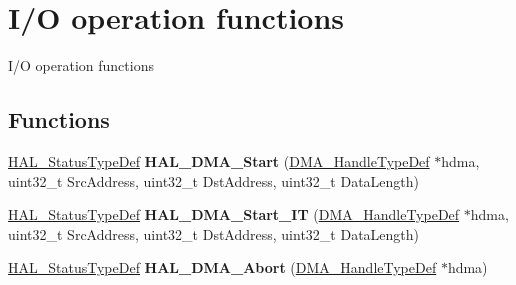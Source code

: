 \hypertarget{group___d_m_a___exported___functions___group2}{}\section{I/O operation functions}
\label{group___d_m_a___exported___functions___group2}


I/O operation functions ~\newline
  


\subsection*{Functions}
\begin{DoxyCompactItemize}
\item 
\mbox{\label{group___d_m_a___exported___functions___group2_ga96fbd9c285135f558fd9283a57406330}} 
\mbox{\hyperlink{stm32f4xx__hal__def_8h_a63c0679d1cb8b8c684fbb0632743478f}{H\+A\+L\+\_\+\+Status\+Type\+Def}} {\bfseries H\+A\+L\+\_\+\+D\+M\+A\+\_\+\+Start} (\mbox{\hyperlink{group___d_m_a___exported___types_ga41b754a906b86bce54dc79938970138b}{D\+M\+A\+\_\+\+Handle\+Type\+Def}} $\ast$hdma, uint32\+\_\+t Src\+Address, uint32\+\_\+t Dst\+Address, uint32\+\_\+t Data\+Length)
\item 
\mbox{\label{group___d_m_a___exported___functions___group2_ga7eddc0931ac8a3d77b23d6d5e68407c7}} 
\mbox{\hyperlink{stm32f4xx__hal__def_8h_a63c0679d1cb8b8c684fbb0632743478f}{H\+A\+L\+\_\+\+Status\+Type\+Def}} {\bfseries H\+A\+L\+\_\+\+D\+M\+A\+\_\+\+Start\+\_\+\+IT} (\mbox{\hyperlink{group___d_m_a___exported___types_ga41b754a906b86bce54dc79938970138b}{D\+M\+A\+\_\+\+Handle\+Type\+Def}} $\ast$hdma, uint32\+\_\+t Src\+Address, uint32\+\_\+t Dst\+Address, uint32\+\_\+t Data\+Length)
\item 
\mbox{\label{group___d_m_a___exported___functions___group2_ga001f9fb04328a7460f9ff16908ff987c}} 
\mbox{\hyperlink{stm32f4xx__hal__def_8h_a63c0679d1cb8b8c684fbb0632743478f}{H\+A\+L\+\_\+\+Status\+Type\+Def}} {\bfseries H\+A\+L\+\_\+\+D\+M\+A\+\_\+\+Abort} (\mbox{\hyperlink{group___d_m_a___exported___types_ga41b754a906b86bce54dc79938970138b}{D\+M\+A\+\_\+\+Handle\+Type\+Def}} $\ast$hdma)
\item 

\end{DoxyCompactItemize}
